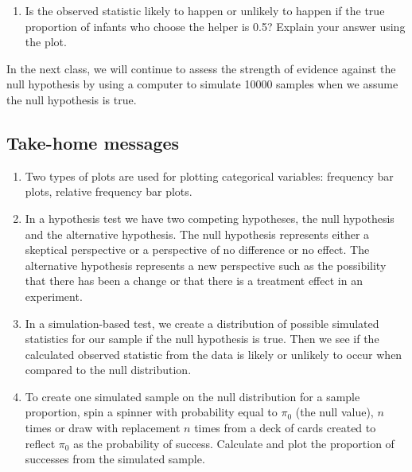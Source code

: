 \documentclass[
]{report}
\providecommand{\tightlist}{%
  \setlength{\itemsep}{0pt}\setlength{\parskip}{0pt}}
\begin{document}
\vspace{0.2in}

\begin{enumerate}
\def\labelenumi{\arabic{enumi}.}
\setcounter{enumi}{9}
\tightlist
\item
  Is the observed statistic likely to happen or unlikely to happen if the true proportion of infants who choose the helper is 0.5? Explain your answer using the plot.
\end{enumerate}

\vspace{0.8in}

In the next class, we will continue to assess the strength of evidence against the null hypothesis by using a computer to simulate 10000 samples when we assume the null hypothesis is true.

\subsection{Take-home messages}\label{take-home-messages-3}

\begin{enumerate}
\def\labelenumi{\arabic{enumi}.}
\item
  Two types of plots are used for plotting categorical variables: frequency bar plots, relative frequency bar plots.
\item
  In a hypothesis test we have two competing hypotheses, the null hypothesis and the alternative hypothesis. The null hypothesis represents either a skeptical perspective or a perspective of no difference or no effect. The alternative hypothesis represents a new perspective such as the possibility that there has been a change or that there is a treatment effect in an experiment.
\item
  In a simulation-based test, we create a distribution of possible simulated statistics for our sample if the null hypothesis is true. Then we see if the calculated observed statistic from the data is likely or unlikely to occur when compared to the null distribution.
\item
  To create one simulated sample on the null distribution for a sample proportion, spin a spinner with probability equal to \(\pi_0\) (the null value), \(n\) times or draw with replacement \(n\) times from a deck of cards created to reflect \(\pi_0\) as the probability of success. Calculate and plot the proportion of successes from the simulated sample.
\end{enumerate}
\end{document}
